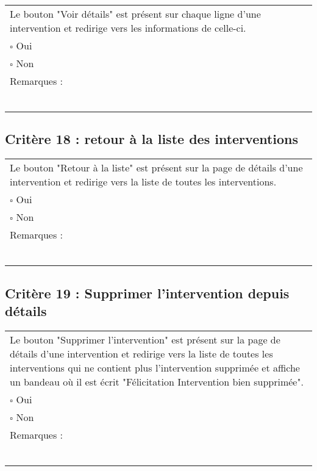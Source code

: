 	\begin{center}
    	 		\begin{tabular}[h]{|p{}|}
			\hline
				Le bouton "Voir détails" est présent sur chaque ligne d'une intervention et redirige vers les informations de celle-ci.\\
				$\square$ Oui  \\ $\square$ Non \\\hline Remarques : \\ ~\\
			 \\\hline
     		\end{tabular}
  		\end{center}	
  		
  		
  		\subsection*{Critère 18 : retour à la liste des interventions}
	
	\begin{center}
    	 		\begin{tabular}[h]{|p{}|}
			\hline
				Le bouton "Retour à la liste" est présent sur la page de détails d'une intervention et redirige vers la liste de toutes les interventions.\\
				$\square$ Oui  \\ $\square$ Non \\\hline Remarques : \\ ~\\
			 \\\hline
     		\end{tabular}
  		\end{center}	
  		
  		
  		\subsection*{Critère 19 : Supprimer l'intervention depuis détails}
	
	\begin{center}
    	 		\begin{tabular}[h]{|p{}|}
			\hline
				Le bouton "Supprimer l'intervention" est présent sur la page de détails d'une intervention et redirige vers la liste de toutes les interventions qui ne contient plus l'intervention supprimée et affiche un bandeau où il est écrit "Félicitation Intervention bien supprimée".\\
				$\square$ Oui  \\ $\square$ Non \\\hline Remarques : \\ ~\\
			 \\\hline
     		\end{tabular}
  		\end{center}
  		
